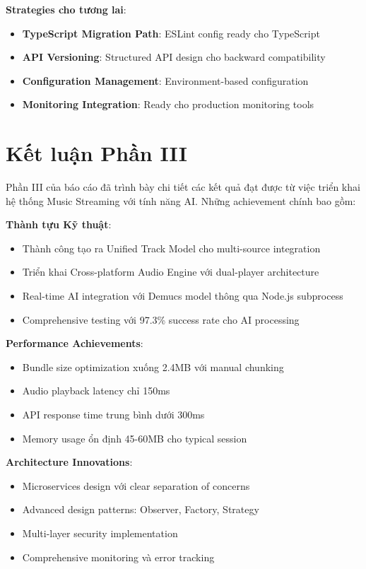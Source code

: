 \documentclass[12pt,a4paper]{article}
\begin{document}
\textbf{Strategies cho tương lai}:
\begin{itemize}
\item \textbf{TypeScript Migration Path}: ESLint config ready cho TypeScript
\item \textbf{API Versioning}: Structured API design cho backward compatibility
\item \textbf{Configuration Management}: Environment-based configuration
\item \textbf{Monitoring Integration}: Ready cho production monitoring tools
\end{itemize}

\section{Kết luận Phần III}

Phần III của báo cáo đã trình bày chi tiết các kết quả đạt được từ việc triển khai hệ thống Music Streaming với tính năng AI. Những achievement chính bao gồm:

\textbf{Thành tựu Kỹ thuật}:
\begin{itemize}
\item Thành công tạo ra Unified Track Model cho multi-source integration
\item Triển khai Cross-platform Audio Engine với dual-player architecture
\item Real-time AI integration với Demucs model thông qua Node.js subprocess
\item Comprehensive testing với 97.3\% success rate cho AI processing
\end{itemize}

\textbf{Performance Achievements}:
\begin{itemize}
\item Bundle size optimization xuống 2.4MB với manual chunking
\item Audio playback latency chỉ 150ms
\item API response time trung bình dưới 300ms
\item Memory usage ổn định 45-60MB cho typical session
\end{itemize}

\textbf{Architecture Innovations}:
\begin{itemize}
\item Microservices design với clear separation of concerns
\item Advanced design patterns: Observer, Factory, Strategy
\item Multi-layer security implementation
\item Comprehensive monitoring và error tracking
\end{itemize}
\end{document}

